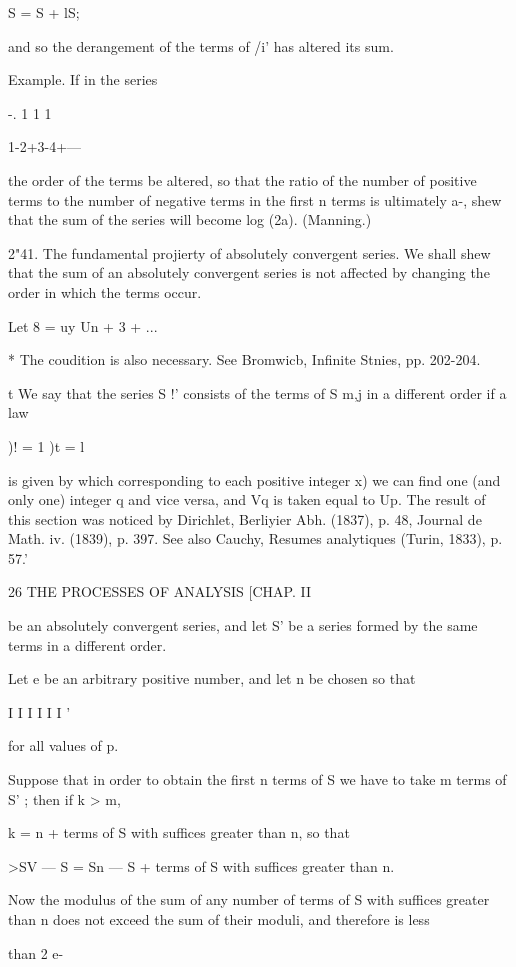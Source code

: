S = S + lS;

and so the derangement of the terms of /i' has altered its sum.

Example. If in the series

-. 1 1 1

1-2+3-4+---

the order of the terms be altered, so that the ratio of the number of
positive terms to the number of negative terms in the first n terms is
ultimately a-, shew that the sum of the series will become log (2a).
(Manning.)

2"41. The fundamental projierty of absolutely convergent series. We
shall shew that the sum of an absolutely convergent series is not
affected by changing the order in which the terms occur.

Let 8 = uy Un + 3 + ...

* The coudition is also necessary. See Bromwicb, Infinite Stnies, pp.
202-204.

t We say that the series S !' consists of the terms of S m,j in a
different order if a law

)! = 1 )t = l

is given by which corresponding to each positive integer x) we can
find one (and only one) integer q and vice versa, and Vq is taken
equal to Up. The result of this section was noticed by Dirichlet,
Berliyier Abh. (1837), p. 48, Journal de Math. iv. (1839), p. 397. See
also Cauchy, Resumes analytiques (Turin, 1833), p. 57.'



26 THE PROCESSES OF ANALYSIS [CHAP. II

be an absolutely convergent series, and let S' be a series formed by
the same terms in a different order.

Let e be an arbitrary positive number, and let n be chosen so that

I I I I I I '

for all values of p.

Suppose that in order to obtain the first n terms of S we have to take
m terms of S' ; then if k > m,

 k = n + terms of S with suffices greater than n, so that

>SV — S = Sn — S + terms of S with suffices greater than n.

Now the modulus of the sum of any number of terms of S with suffices
greater than n does not exceed the sum of their moduli, and therefore
is less

than 2 e-

